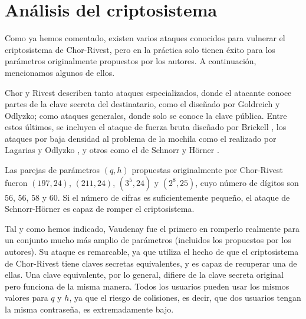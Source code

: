     \section{Análisis del criptosistema}
    
    Como ya hemos comentado, existen varios ataques conocidos para vulnerar el criptosistema de Chor-Rivest, pero en la práctica solo tienen éxito para los parámetros originalmente propuestos por los autores. A continuación, mencionamos algunos de ellos.
    
    Chor y Rivest \cite{artChorRivest} describen tanto ataques especializados, donde el atacante conoce partes de la clave secreta del destinatario, como el diseñado por Goldreich y Odlyzko; como ataques generales, donde solo se conoce la clave pública. Entre estos últimos, se incluyen el ataque de fuerza bruta diseñado por Brickell \cite{atBrickell}, los ataques por baja densidad al problema de la mochila como el realizado por Lagarias y Odlyzko \cite{artLagOdl}, y otros como el de Schnorr y Hörner \cite{atSchnorrHorner}.

    Las parejas de parámetros $(q, h)$ propuestas originalmente por Chor-Rivest fueron $(197, 24)$, $(211, 24)$, $(3^{5}, 24)$ y $(2^{8}, 25)$, cuyo número de dígitos son $56$, $56$, $58$ y $60$. Si el número de cifras es suficientemente pequeño, el ataque de Schnorr-Hörner es capaz de romper el criptosistema.

    Tal y como hemos indicado, Vaudenay fue el primero en romperlo realmente para un conjunto mucho más amplio de parámetros (incluidos los propuestos por los autores). Su ataque es remarcable, ya que utiliza el hecho de que el criptosistema de Chor-Rivest tiene claves secretas equivalentes, y es capaz de recuperar una de ellas. Una clave equivalente, por lo general, difiere de la clave secreta original pero funciona de la misma manera. Todos los usuarios pueden usar los mismos valores para $q$ y $h$, ya que el riesgo de colisiones, es decir, que dos usuarios tengan la misma contraseña, es extremadamente bajo.

